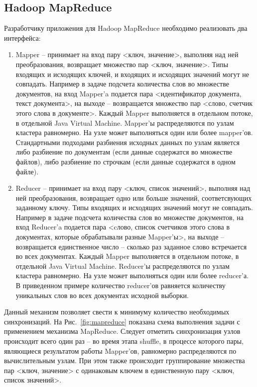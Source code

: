\documentclass[a4paper,11pt]{article}
\begin{document}
\subsection{Hadoop MapReduce}
Разработчику приложения для Hadoop MapReduce необходимо реализовать два интерфейса:
\begin{enumerate}
    \item Mapper -- принимает на вход пару <ключ, значение>, выполняя над ней преобразования, возвращает множество пар
          <ключ, значение>. Типы входящих и исходящих ключей, и входящих и исходящих значений могут не совпадать.
          Например в задаче подсчета количества слов во множестве документов, на вход Mapper'a подается пара
          <идентификатор документа, текст документа>, на выходе -- возвращается множество пар <слово, счетчик этого
          слова в документе>. Каждый Mapper выполняется в отдельном потоке, в отдельной Java Virtual Machine. Mapper'ы
          распределяются по узлам кластера равномерно. На узле может выполняться один или более mapper'ов. Стандартными
          подходами разбиения исходных данных по узлам является либо разбиение по документам (если данные содержатся во
          множестве файлов), либо разбиение по строчкам (если данные содержатся в одном файле).
    \item Reducer -- принимает на вход пару <ключ, список значений>, выполняя над ней преобразования, возвращает одно
          или больше значений, соответсвующих заданному ключу. Типы входящих и исходящих значений могут не совпадать.
          Например в задаче подсчета количества слов во множестве документов, на вход Reducer'a подается пара
          <cлово, список счетчиков этого слова в документах, которые обрабатывали разные Mapper'ы>, на выходе --
          возвращается единственное число -- сколько раз заданное слово встречается во всех документах. Каждый Mapper
          выполняется в отдельном потоке, в отдельной Java Virtual Machine. Reducer'ы распределяются по узлам кластера
          равномерно. На узле может выполняться один или более reducer'а. В приведенном примере количество reducer'ов
          равняется количеству уникальных слов во всех документах исходной выборки.
\end{enumerate}

Данный механизм позволяет свести к минимуму количество необходимых синхронизаций. На Рис.~\ref{fig:mapreduce} показана
схема выполнения задачи с применением механизма MapReduce. Следует отметить синхронизация узлов происходит всего один
раз -- во время этапа shuffle, в процессе которого пары, являющиеся результатом работы Mapper'ов, равномерно
распределяются по вычислительным узлам. При этом также происходит группирование множества пар <ключ, значение> с
одинаковым ключем в единственную пару <ключ, список значений>.
\end{document}
